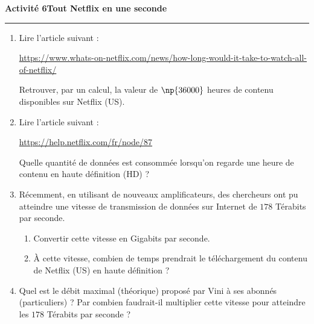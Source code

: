 \documentclass[a4paper]{article}
\begin{document}
\noindent\textbf{Activité 6}\hfill{}\textbf{\og{}Tout\fg{} Netflix en une seconde}
\smallskip
\hrule
\medskip

\begin{enumerate}
  \item Lire l'article suivant :
    \begin{center}
      \url{https://www.whats-on-netflix.com/news/how-long-would-it-take-to-watch-all-of-netflix/}
    \end{center}
    Retrouver, par un calcul, la valeur de \og{}$\np{36000}$ heures\fg{} de contenu disponibles sur Netflix (US).
  \item Lire l'article suivant :
    \begin{center}
      \url{https://help.netflix.com/fr/node/87}
    \end{center}
    Quelle quantité de données est consommée lorsqu'on regarde une heure de contenu en haute définition (HD) ?
  \item Récemment, en utilisant de nouveaux amplificateurs, des chercheurs ont pu atteindre une vitesse de transmission de données sur Internet de $178$ Térabits par seconde.
    \begin{enumerate}
      \item Convertir cette vitesse en Gigabits par seconde.
      \item À cette vitesse, combien de temps prendrait le téléchargement du contenu de Netflix (US) en haute définition ?
    \end{enumerate}
  \item Quel est le débit maximal (théorique) proposé par Vini à ses abonnés (particuliers) ? Par combien faudrait-il multiplier cette vitesse pour atteindre les $178$ Térabits par seconde ?
\end{enumerate}
\end{document}
